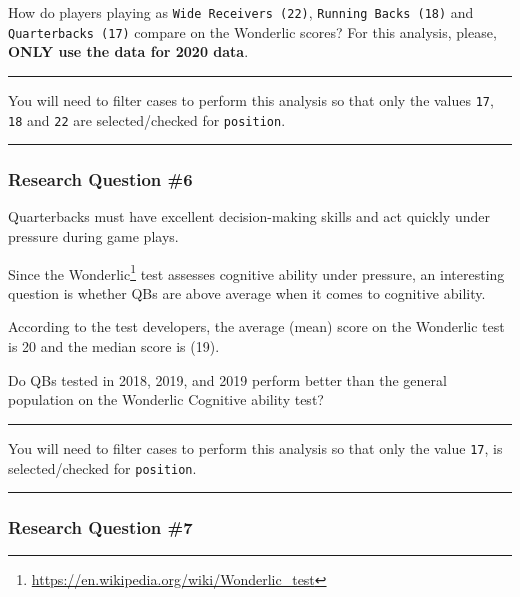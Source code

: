 \documentclass[
]{article}
\begin{document}
How do players playing as \texttt{Wide\ Receivers\ (22)}, \texttt{Running\ Backs\ (18)} and \texttt{Quarterbacks\ (17)} compare on the Wonderlic scores? For this analysis, please, \textbf{ONLY use the data for 2020 data}.

\begin{center}\rule{0.5\linewidth}{0.5pt}\end{center}

You will need to filter cases to perform this analysis so that only the values \texttt{17}, \texttt{18} and \texttt{22} are selected/checked for \texttt{position}.

\begin{center}\rule{0.5\linewidth}{0.5pt}\end{center}

\hypertarget{research-question-6}{%
\subsubsection{Research Question \#6}\label{research-question-6}}

Quarterbacks must have excellent decision-making skills and act quickly under pressure during game plays.

Since the Wonderlic\footnote{\url{https://en.wikipedia.org/wiki/Wonderlic_test}} test assesses cognitive ability under pressure, an interesting question is whether QBs are above average when it comes to cognitive ability.

According to the test developers, the average (mean) score on the Wonderlic test is 20 and the median score is (19).

Do QBs tested in 2018, 2019, and 2019 perform better than the general population on the Wonderlic Cognitive ability test?

\begin{center}\rule{0.5\linewidth}{0.5pt}\end{center}

You will need to filter cases to perform this analysis so that only the value \texttt{17}, is selected/checked for \texttt{position}.

\begin{center}\rule{0.5\linewidth}{0.5pt}\end{center}

\hypertarget{research-question-7}{%
\subsubsection{Research Question \#7}\label{research-question-7}}
\end{document}
